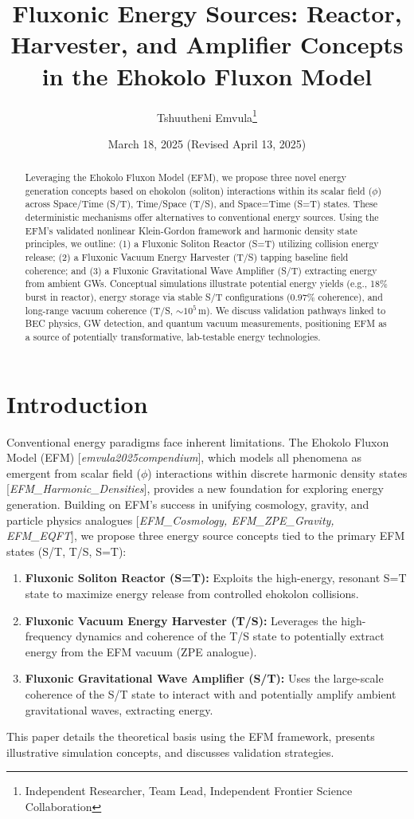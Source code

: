 \documentclass[11pt]{article}
\title{Fluxonic Energy Sources: Reactor, Harvester, and Amplifier Concepts in the Ehokolo Fluxon Model}
\author{Tshuutheni Emvula\thanks{Independent Researcher, Team Lead, Independent Frontier Science Collaboration}}
\date{March 18, 2025 (Revised April 13, 2025)} %
\newcommand{\citep}[1]{[\textit{#1}]} %
\begin{document}
\maketitle

\begin{abstract}
Leveraging the Ehokolo Fluxon Model (EFM), we propose three novel energy generation concepts based on ehokolon (soliton) interactions within its scalar field (\(\phi\)) across Space/Time (S/T), Time/Space (T/S), and Space=Time (S=T) states. These deterministic mechanisms offer alternatives to conventional energy sources. Using the EFM's validated nonlinear Klein-Gordon framework and harmonic density state principles, we outline: (1) a Fluxonic Soliton Reactor (S=T) utilizing collision energy release; (2) a Fluxonic Vacuum Energy Harvester (T/S) tapping baseline field coherence; and (3) a Fluxonic Gravitational Wave Amplifier (S/T) extracting energy from ambient GWs. Conceptual simulations illustrate potential energy yields (e.g., 18\% burst in reactor), energy storage via stable S/T configurations (0.97\% coherence), and long-range vacuum coherence (T/S, \(\sim 10^5 \, \text{m}\)). We discuss validation pathways linked to BEC physics, GW detection, and quantum vacuum measurements, positioning EFM as a source of potentially transformative, lab-testable energy technologies.
\end{abstract}

\section{Introduction}
Conventional energy paradigms face inherent limitations. The Ehokolo Fluxon Model (EFM) \citep{emvula2025compendium}, which models all phenomena as emergent from scalar field (\(\phi\)) interactions within discrete harmonic density states \citep{EFM_Harmonic_Densities}, provides a new foundation for exploring energy generation. Building on EFM's success in unifying cosmology, gravity, and particle physics analogues \citep{EFM_Cosmology, EFM_ZPE_Gravity, EFM_EQFT}, we propose three energy source concepts tied to the primary EFM states (S/T, T/S, S=T):
\begin{enumerate}
    \item \textbf{Fluxonic Soliton Reactor (S=T):} Exploits the high-energy, resonant S=T state to maximize energy release from controlled ehokolon collisions.
    \item \textbf{Fluxonic Vacuum Energy Harvester (T/S):} Leverages the high-frequency dynamics and coherence of the T/S state to potentially extract energy from the EFM vacuum (ZPE analogue).
    \item \textbf{Fluxonic Gravitational Wave Amplifier (S/T):} Uses the large-scale coherence of the S/T state to interact with and potentially amplify ambient gravitational waves, extracting energy.
\end{enumerate}
This paper details the theoretical basis using the EFM framework, presents illustrative simulation concepts, and discusses validation strategies.
\end{document}
